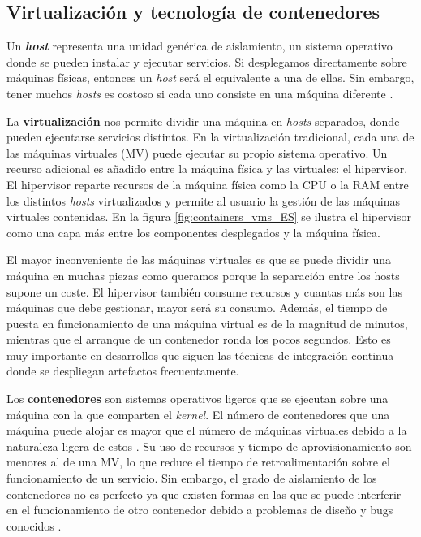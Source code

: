\documentclass[11pt,spanish,listoffigures]{tfgetsinf}
\begin{document}
\subsection{Virtualización y tecnología de contenedores}

Un \textbf{\textit{host}} representa una unidad genérica de aislamiento, un sistema operativo donde se pueden instalar y ejecutar servicios. Si desplegamos directamente sobre máquinas físicas, entonces un \textit{host} será el equivalente a una de ellas. Sin embargo, tener muchos \textit{hosts} es costoso si cada uno consiste en una máquina diferente \cite{Newman2015a}.

La \textbf{virtualización} nos permite dividir una máquina en \textit{hosts} separados, donde pueden ejecutarse servicios distintos. En la virtualización tradicional, cada una de las máquinas virtuales (MV) puede ejecutar su propio sistema operativo. Un recurso adicional es añadido entre la máquina física y las virtuales: el hipervisor. El hipervisor reparte recursos de la máquina física como la CPU o la RAM entre los distintos \textit{hosts} virtualizados y permite al usuario la gestión de las máquinas virtuales contenidas. En la figura \ref{fig:containers_vms_ES} se ilustra el hipervisor como una capa más entre los componentes desplegados y la máquina física.

El mayor inconveniente de las máquinas virtuales es que se puede dividir una máquina en muchas piezas como queramos porque la separación entre los hosts supone un coste. El hipervisor también consume recursos y cuantas más son las máquinas que debe gestionar, mayor será su consumo. Además, el tiempo de puesta en funcionamiento de una máquina virtual es de la magnitud de minutos, mientras que el arranque de un contenedor ronda los pocos segundos. \cite{Dua2014} Esto es muy importante en desarrollos que siguen las técnicas de integración continua donde se despliegan artefactos frecuentamente. 

Los \textbf{contenedores} son sistemas operativos ligeros que se ejecutan sobre una máquina con la que comparten el \textit{kernel}. El número de contenedores que una máquina puede alojar es mayor que el número de máquinas virtuales debido a la naturaleza ligera de estos \cite{Dua2014}. Su uso de recursos y tiempo de aprovisionamiento son menores al de una MV, lo que reduce el tiempo de retroalimentación sobre el funcionamiento de un servicio. Sin embargo, el grado de aislamiento de los contenedores no es perfecto ya que existen formas en las que se puede interferir en el funcionamiento de otro contenedor debido a problemas de diseño y bugs conocidos \cite{Newman2015a}.
\end{document}

